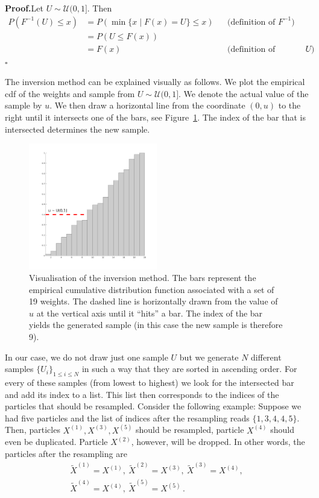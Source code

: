 \textbf{Proof.}\quad Let $U \sim \mathcal{U} (0,1]$. Then
\begin{align*}
  P(F^{-1}(U) \le x) &= P(\min \{x \mid F(x) = U \} \le x ) && \text{(definition of $F^{-1}$)} \\
                     &= P(U \le F(x)) \\
                     &= F(x) && \text{(definition of distribution of $U$)}\,.
\end{align*}
\hfill$\square$

The inversion method can be explained visually as follows. We plot the
empirical cdf of the weights and sample from
$U \sim \mathcal{U}(0,1]$. We denote the actual value of the sample by
$u$. We then draw a horizontal line from the coordinate $(0,u)$ to the
right until it intersects one of the bars, see
Figure~\ref{fig:ecdf}. The index of the bar that is intersected
determines the new sample.

\begin{figure}
  \centering \includegraphics[width=0.5\textwidth]{figures/ecdf.png}
  \caption{Visualisation of the inversion method. The bars represent
    the empirical cumulative distribution function associated with a
    set of 19 weights. The dashed line is horizontally drawn from the
    value of $u$ at the vertical axis until it ``hits'' a bar. The
    index of the bar yields the generated sample (in this case the new
    sample is therefore 9). }
  \label{fig:ecdf}
\end{figure}

In our case, we do not draw just one sample $U$ but we generate $N$
different samples $\{U_i\}_{1 \le i \le N}$ in such a way that they
are sorted in ascending order. For every of these samples (from lowest
to highest) we look for the intersected bar and add its index to a
list. This list then corresponds to the indices of the particles that
should be resampled. Consider the following example: Suppose we had
five particles and the list of indices after the resampling reads
$\{1,3,4,4,5\}$. Then, particles $X^{(1)},X^{(3)},X^{(5)}$ should be
resampled, particle $X^{(4)}$ should even be duplicated. Particle
$X^{(2)}$, however, will be dropped. In other words, the particles
after the resampling are
\begin{gather*}
  \tilde{X}^{(1)}=X^{(1)},\ \tilde{X}^{(2)}=X^{(3)},\ \tilde{X}^{(3)}=X^{(4)},\\
  \tilde{X}^{(4)}=X^{(4)},\ \tilde{X}^{(5)}=X^{(5)}\,.
\end{gather*}

